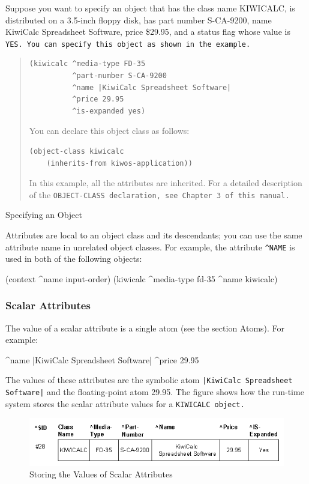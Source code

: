 Suppose you want to specify an object that has the class name
KIWICALC, is distributed on a 3.5-inch floppy disk, has part
number S-CA-9200, name KiwiCalc Spreadsheet Software, price
{\$}29.95, and a status flag whose value is \tt{YES}. You can specify
this object as shown in the example.

\begin{example}[h]
\begin{quote}
\begin{verbatim}
(kiwicalc ^media-type FD-35
          ^part-number S-CA-9200
          ^name |KiwiCalc Spreadsheet Software|
          ^price 29.95
          ^is-expanded yes)
\end{verbatim}
You can declare this object class as follows:
\begin{verbatim}
(object-class kiwicalc
    (inherits-from kiwos-application))
\end{verbatim}           
In this example, all the attributes are inherited. For a
detailed description of the \tt{OBJECT-CLASS} declaration, see
Chapter 3 of this manual.
\end{quote}
\caption{Specifying an Object}
\label{e:specobj}
\end{example}

Attributes are local to an object class and its descendants;
you can use the same attribute name in unrelated object
classes. For example, the attribute \verb|^NAME| is used in both of
the following objects:
\begin{qv}
(context ^name input-order)
(kiwicalc ^media-type fd-35 ^name kiwicalc)
\end{qv}

\subsubsection*{Scalar Attributes}

The value of a scalar attribute is a single atom (see the
section Atoms). For example:
\begin{qv}
^name |KiwiCalc Spreadsheet Software|
^price 29.95
\end{qv}
The values of these attributes are the symbolic atom
\verb,|KiwiCalc Spreadsheet Software|, and the floating-point atom
29.95. The figure shows how the run-time system stores the
scalar attribute values for a \tt{KIWICALC} object.

\begin{figure}[h]
  \centering
  \includegraphics[scale=0.7]{f2-5}
  \caption{Storing the Values of Scalar Attributes}
  \label{f:2-5}
\end{figure}

